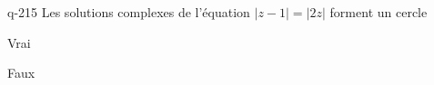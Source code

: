\begin{truefalse}{q-215}
Les solutions complexes de l'équation $|z-1|=|2z|$ forment un cercle
\item* Vrai
\item Faux
\end{truefalse}

